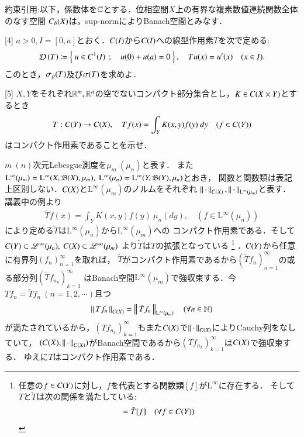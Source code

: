 約束引用:以下，係数体を$\mathbb{C}$とする．位相空間$X$上の有界な複素数値連続関数全体のなす空間
$C_b (X)$は，sup-normによりBanach空間とみなす．

	\begin{itembox}[l]{[4]}
		$a > 0,I = [0,a]$とおく．$C(I)$から$C(I)$への線型作用素$T$を次で定める:
			\begin{align}
				\Dom{T} \coloneqq \Set{u \in \cn{I}{1}}{u(0) + u(a) = 0},
				\quad Tu(x) = u'(x) \quad (x \in I).
			\end{align}
			このとき，$\mathfrak{\sigma}_p (T) $及び$\mathfrak{\sigma} (T) $を求めよ．
	\end{itembox}
	
	
	
\newpage
	\begin{itembox}[l]{[5]}
		$X,Y$をそれぞれ$\mathbb{R}^m,\mathbb{R}^n$の空でないコンパクト部分集合とし，$K \in C(X \times Y)$とするとき
		\begin{align}
			T:C(Y) \rightarrow C(X),
			\quad T f(x) = \int_Y K(x,y) f(y)\ dy \quad (f \in C(Y))
		\end{align}
		はコンパクト作用素であることを示せ．
	\end{itembox}
	
	\begin{prf}
		$m\ (n)$次元Lebesgue測度を$\mu_m\ (\mu_n)$と表す．
		また$\mathrm{L}^\infty(\mu_m) = \mathrm{L}^\infty(X,\borel{X},\mu_m),\ 
		\mathrm{L}^\infty(\mu_n) = \mathrm{L}^\infty(Y,\borel{Y},\mu_n)$とおき，
		関数と関数類は表記上区別しない．$C(X)$と$\mathrm{L}^\infty(\mu_m)$のノルムをそれぞれ
		$\left\|\, \cdot\, \right\|_{C(X)},\left\|\, \cdot\, \right\|_{\mathrm{L}^\infty(\mu_m)}$と表す．
		講義中の例より
		\begin{align}
			\tilde{T}f (x) = \int_Y K(x,y) f(y)\ \mu_n(dy),
			\quad \left( f \in \mathrm{L}^\infty(\mu_n) \right)
		\end{align}
		により定める$\tilde{T}$は$\mathrm{L}^\infty(\mu_n)$から$\mathrm{L}^\infty(\mu_m)$への
		コンパクト作用素である．そして$C(Y) \subset \mathscr{L}^\infty(\mu_n),\ C(X) \subset \mathscr{L}^\infty(\mu_m)$
		より$\tilde{T}$は$T$の拡張となっている
		\footnote{
			任意の$f \in C(Y)$に対し，$f$を代表とする関数類$[f]$が$\mathrm{L}^\infty$に存在する．
			そして$T$と$\tilde{T}$は次の関係を満たしている:
			\begin{align}
				[Tf] = \tilde{T}[f]
				\quad (\forall f \in \c{Y})
			\end{align}
		}
		．$C(Y)$から任意に有界列$(f_n)_{n=1}^{\infty}$を取れば，
		$\tilde{T}$がコンパクト作用素であるから$\left( \tilde{T} f_n \right)_{n=1}^{\infty}$の或る部分列$\left( \tilde{T} f_{n_k} \right)_{k=1}^{\infty}$
		はBanach空間$\mathrm{L}^\infty(\mu_m)$で強収束する．今$T f_n = \tilde{T} f_n\ (n=1,2,\cdots)$且つ
		\begin{align}
			\left\|\, T f_n\, \right\|_{C(X)} = \left\|\, \tilde{T}f_n\, \right\|_{\mathrm{L}^\infty(\mu_m)} 
			\quad (\forall n \in \mathbb{N})
		\end{align}
		が満たされているから，$\left( T f_{n_k} \right)_{k=1}^{\infty}$もまた$C(X)$で$\left\|\, \cdot\, \right\|_{C(X)}$によりCauchy列をなしていて，
		$(C(X),\left\|\, \cdot\, \right\|_{C(X)})$がBanach空間であるから$\left( T f_{n_k} \right)_{k=1}^{\infty}$は$C(X)$で強収束する．
		ゆえに$T$はコンパクト作用素である．
		\QED
	\end{prf}
	
